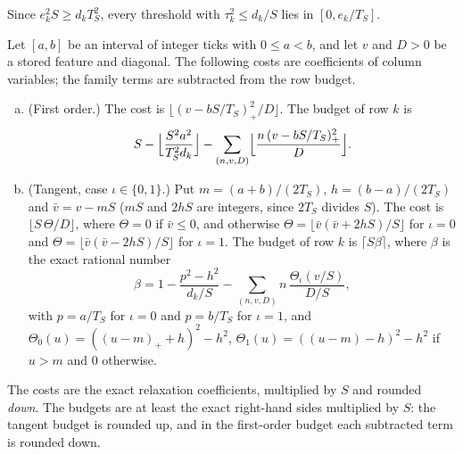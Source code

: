 \documentclass[11pt]{amsart}
\numberwithin{equation}{section}
\theoremstyle{plain}
\theoremstyle{definition}
\theoremstyle{remark}
\newcommand{\1}{\mathbf{1}}
\begin{document}
Since $e_k^2S\ge d_kT_S^2$, every threshold with $\tau_k^2\le d_k/S$ lies in
$[0,e_k/T_S]$.

\begin{definition}\label{def:costs}
Let $[a,b]$ be an interval of integer ticks with $0\le a<b$, and let $v$ and $D>0$
be a stored feature and diagonal. The following costs are coefficients of column
variables; the family terms are subtracted from the row budget.
\begin{enumerate}[(a)]
  \item (First order.) The cost is $\lfloor(v-bS/T_S)_+^2/D\rfloor$. The budget of row $k$ is
    \[
      S-\Bigl\lfloor\frac{S^2a^2}{T_S^2d_k}\Bigr\rfloor-\sum_{(n,v,D)}\Bigl\lfloor\frac{n\,(v-bS/T_S)_+^2}{D}\Bigr\rfloor .
    \]
  \item (Tangent, case $\iota\in\{0,1\}$.) Put $m=(a+b)/(2T_S)$, $h=(b-a)/(2T_S)$ and $\bar v=v-mS$
    ($mS$ and $2hS$ are integers, since $2T_S$ divides $S$).
    The cost is $\lfloor S\,\Theta/D\rfloor$, where $\Theta=0$ if $\bar v\le0$, and otherwise
    $\Theta=\lfloor\bar v(\bar v+2hS)/S\rfloor$ for $\iota=0$ and $\Theta=\lfloor\bar v(\bar v-2hS)/S\rfloor$ for $\iota=1$. The
    budget of row $k$ is $\lceil S\beta\rceil$, where $\beta$ is the exact rational number
    \[
      \beta=1-\frac{p^2-h^2}{d_k/S}-\sum_{(n,v,D)}n\,\frac{\Theta_\iota(v/S)}{D/S},
    \]
    with $p=a/T_S$ for $\iota=0$ and $p=b/T_S$ for $\iota=1$, and $\Theta_0(u)=((u-m)_++h)^2-h^2$,
    $\Theta_1(u)=((u-m)-h)^2-h^2$ if $u>m$ and $0$ otherwise.
\end{enumerate}
\end{definition}

The costs are the exact relaxation coefficients, multiplied by $S$ and rounded \emph{down}. The
budgets are at least the exact right-hand sides multiplied by $S$: the tangent budget is rounded up,
and in the first-order budget each subtracted term is rounded down.
\end{document}
